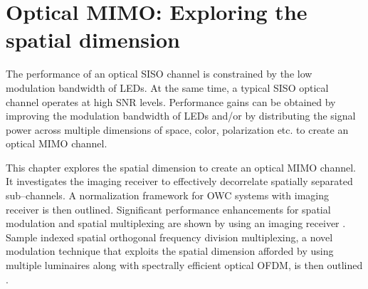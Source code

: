\chapter{Optical MIMO: Exploring the spatial dimension}
\label{chapter:mimoSpace}
\thispagestyle{myheadings}
The performance of an optical SISO channel is constrained by the low modulation bandwidth of LEDs. At the same time, a typical SISO optical channel operates at high SNR levels. Performance gains can be obtained by improving the modulation bandwidth of LEDs and/or by distributing the signal power across multiple dimensions of space, color, polarization etc. to create an optical MIMO channel.

This chapter explores the spatial dimension to create an optical MIMO channel. It investigates the imaging receiver to effectively decorrelate spatially separated sub--channels. A normalization framework for OWC systems with imaging receiver is then outlined. Significant performance enhancements for spatial modulation and spatial multiplexing are shown by using an imaging receiver \cite{but14a}. Sample indexed spatial orthogonal frequency division multiplexing, a novel modulation technique that exploits the spatial dimension afforded by using multiple luminaires along with spectrally efficient optical OFDM, is then outlined \cite{but14b}.








\cleardoublepage